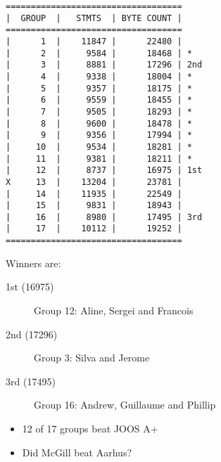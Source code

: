 \documentclass[a4,portrait]{seminar}
\begin{document}
\boldmath
{}

 



\begin{slide*}
\begin{small}
\begin{verbatim}
===================================
|  GROUP  |   STMTS  | BYTE COUNT |
===================================
|      1  |    11847 |      22480 |
|      2  |     9584 |      18468 | *
|      3  |     8881 |      17296 | 2nd
|      4  |     9338 |      18004 | *
|      5  |     9357 |      18175 | *
|      6  |     9559 |      18455 | *
|      7  |     9505 |      18293 | *
|      8  |     9600 |      18478 | *
|      9  |     9356 |      17994 | *
|     10  |     9534 |      18281 | *
|     11  |     9381 |      18211 | *
|     12  |     8737 |      16975 | 1st
X     13  |    13204 |      23781 |
|     14  |    11935 |      22549 |
|     15  |     9831 |      18943 | 
|     16  |     8980 |      17495 | 3rd
|     17  |    10112 |      19252 |
===================================
\end{verbatim}
\end{small}
\end{slide*}

\begin{slide*}
\end{slide*}

\begin{slide*}

Winners are:

\begin{description}
\item[1st (16975)] Group 12:  Aline, Sergei and Francois
\item[2nd (17296)] Group 3:   Silva and Jerome 
\item[3rd (17495)] Group 16:  Andrew, Guillaume and Phillip
\end{description}

\begin{itemize}
\item 12 of 17 groups beat JOOS A+
\item Did McGill beat Aarhus?
\end{itemize}
\end{slide*}
\end{document}
